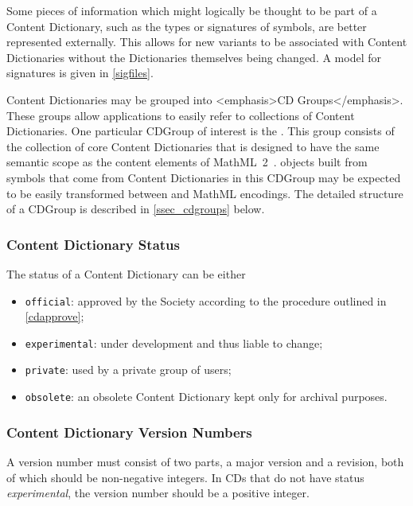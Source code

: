 Some pieces of information which might logically be thought to be part of a Content
Dictionary, such as the types or signatures of symbols, are better represented externally.
This allows for new variants to be associated with Content Dictionaries without the
Dictionaries themselves being changed.  A model for signatures is given in \ref{sigfiles}.
    
Content Dictionaries may be grouped into <emphasis>CD Groups</emphasis>. These groups
allow applications to easily refer to collections of Content Dictionaries. One particular
CDGroup of interest is the . This group consists of the
collection of core Content Dictionaries that is designed to have the same semantic scope
as the content elements of MathML~2~\cite{MathML_2003}.  \OM objects built from symbols
that come from Content Dictionaries in this CDGroup may be expected to be easily
transformed between \OM and MathML encodings.  The detailed structure of a CDGroup is
described in \ref{ssec_cdgroups} below.
    
\subsubsection{Content Dictionary Status}\label{sec_status}

The status of a Content Dictionary can be either
\begin{itemize}
\item \lstinline|official|: approved by the \OM Society according to the procedure
  outlined in \ref{cdapprove};
\item \lstinline|experimental|: under development and thus liable to change;
\item \lstinline|private|: used by a private group of \OM users;
\item \lstinline|obsolete|: an obsolete Content Dictionary kept only for archival
  purposes.
\end{itemize}
 
\subsubsection{Content Dictionary Version Numbers}\label{sec_version}
      
A version number must consist of two parts, a major version and a revision, both of which
should be non-negative integers.  In CDs that do not have status \emph{experimental}, the
version number should be a positive integer.
      
